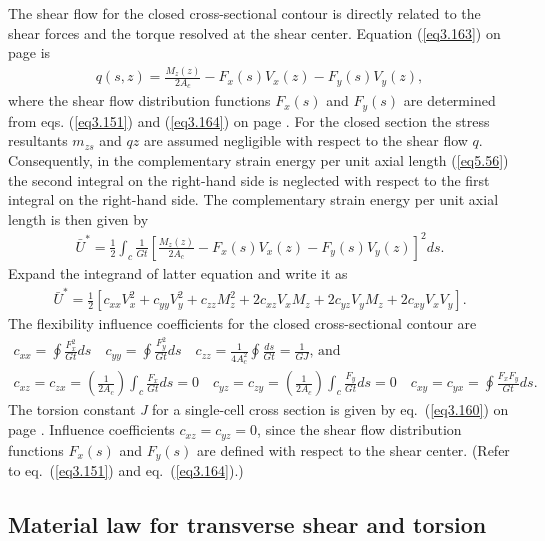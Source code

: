 \documentclass{AeroStructure-ERJohnson}
\begin{document}
The shear flow for the closed cross-sectional contour is directly related to the shear forces and the torque resolved at the shear center. Equation (\ref{eq3.163}) on page \pageref{eq3.163} is
\begin{align*}
q(s, z)=\frac{M_{z}(z)}{2 A_{c}}-F_{x}(s) V_{x}(z)-F_{y}(s) V_{y}(z),
\end{align*}
where the shear flow distribution functions $F_{x}(s)$ and $F_{y}(s)$ are determined from eqs. (\ref{eq3.151}) and (\ref{eq3.164}) on page \pageref{eq3.164}. For the closed section the stress resultants $m_{z s}$ and $q z$ are assumed negligible with respect to the shear flow $q$. Consequently, in the complementary strain energy per unit axial length (\ref{eq5.56}) the second integral on the right-hand side is neglected with respect to the first integral on the right-hand side. The complementary strain energy per unit axial length is then given by
\begin{align}\label{eq5.63}
\bar{U}^{*}=\frac{1}{2} \int_{c}\frac{1}{G t}\left[\frac{M_{z}(z)}{2 A_{c}}-F_{x}(s) V_{x}(z)-F_{y}(s) V_{y}(z)\right]^{2} d s.
\end{align}
Expand the integrand of latter equation and write it as
\begin{align}\label{eq5.64}
\bar{U}^{*}=\frac{1}{2}\left[c_{x x} V_{x}^{2}+c_{y y} V_{y}^{2}+c_{z z} M_{z}^{2}+2 c_{x z} V_{x} M_{z}+2 c_{y z} V_{y} M_{z}+2 c_{x y} V_{x} V_{y}\right].
\end{align}
The flexibility influence coefficients for the closed cross-sectional contour are
\begin{gather}
c_{x x}=\oint\frac{F_{x}^{2}}{G t} d s \quad c_{y y}=\oint \frac{F_{y}^{2}}{G t} d s \quad c_{z z}=\frac{1}{4 A_{c}^{2}} \oint \frac{d s}{G t}=\frac{1}{G J}\mbox{, and}\label{eq5.65}\\
c_{xz}=c_{zx}=\left(\frac{1}{2A_c}\right)\int_c\frac{F_x}{Gt}ds=0\quad c_{yz}=c_{zy}=\left(\frac{1}{2A_c}\right)\int_c\frac{F_y}{Gt}ds=0\quad
c_{xy}=c_{yx}=\oint\frac{F_xF_y}{Gt}ds.\label{eq5.66}
\end{gather}
The torsion constant \textit{J} for a single-cell cross section is given by eq.~(\ref{eq3.160}) on page \pageref{eq3.160}. Influence coefficients $c_{x z}=c_{y z}=0$, since the shear flow distribution functions $F_{x}(s)$ and $F_{y}(s)$ are defined with respect to the shear center. (Refer to eq.~(\ref{eq3.151}) and eq.~(\ref{eq3.164}).)

\subsection{Material law for transverse shear and torsion}\label{sec5.5.3}
\end{document}
